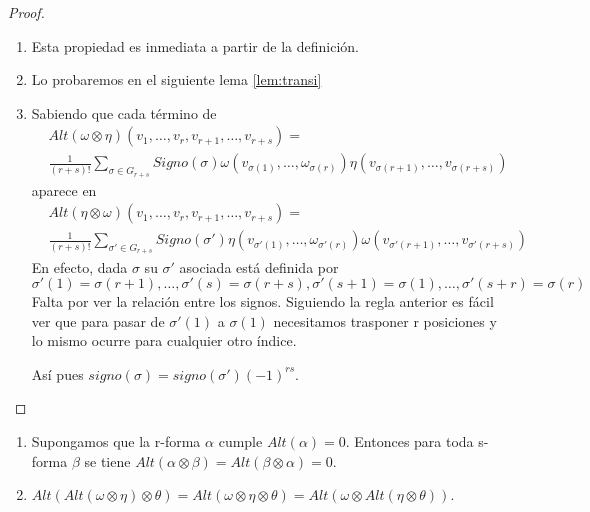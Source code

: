 \documentclass[../VD.tex]{subfiles}
\begin{document}
\begin{proof}
\begin{enumerate}
\item Esta propiedad es inmediata a partir de la definición.
\item Lo probaremos en el siguiente lema \ref{lem:transi}
\item Sabiendo que cada término de
\begin{align*}
&Alt(\omega\otimes\eta)(v_1,\ldots,v_r,v_{r+1},\ldots,v_{r+s})=\\
&\frac{1}{(r+s)!}\sum_{\sigma\in G_{r+s}}Signo(\sigma)\omega(v_{\sigma(1)},\ldots,\omega_{\sigma(r)})\eta(v_{\sigma(r+1)},\ldots,v_{\sigma(r+s)})
\end{align*}
aparece en
\begin{align*}
&Alt(\eta\otimes\omega)(v_1,\ldots,v_r,v_{r+1},\ldots,v_{r+s})=\\
&\frac{1}{(r+s)!}\sum_{\sigma'\in G_{r+s}}Signo(\sigma')\eta(v_{\sigma'(1)},\ldots,\omega_{\sigma'(r)})\omega(v_{\sigma'(r+1)},\ldots,v_{\sigma'(r+s)})
\end{align*}
En efecto, dada \( \sigma \) su \( \sigma' \) asociada está definida por
\(
\sigma'(1)=\sigma(r+1),\ldots,\sigma'(s)=\sigma(r+s),\sigma'(s+1)=\sigma(1),\ldots,\sigma'(s+r)=\sigma(r)
\)
Falta por ver la relación entre los signos. Siguiendo la regla anterior es fácil ver que para pasar de \( \sigma'(1) \) a \( \sigma(1) \) necesitamos trasponer r posiciones y lo mismo ocurre para cualquier otro índice.

Así pues \( signo(\sigma)=signo(\sigma')(-1)^{rs} \).
\end{enumerate}
\end{proof}

\begin{lemma}\label{lem:transi}
	\begin{enumerate}
\item Supongamos que la r-forma \( \alpha \) cumple \( Alt(\alpha)=0 \). Entonces para toda s-forma \( \beta \) se tiene \( Alt(\alpha\otimes\beta)=Alt(\beta\otimes\alpha)=0 \).
\item \( Alt(Alt(\omega\otimes\eta)\otimes\theta)=Alt(\omega\otimes\eta\otimes\theta)=Alt(\omega\otimes Alt(\eta\otimes \theta)) \).
\end{enumerate}
\end{lemma}
\end{document}
